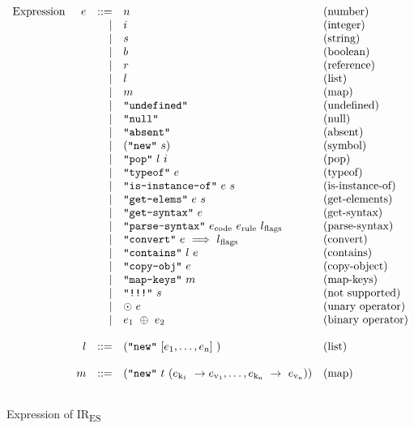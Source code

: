 \documentclass[acmsmall,screen]{acmart}
\newcommand{\irname}[0]{IR\textsubscript{ES}\xspace}
\newcommand{\Cd}[1]{\texttt{#1}}
\newcommand{\primitive}[1]{ \Cd{#1}}
\newcommand{\subsc}[2]{#1\textsubscript{#2}}
\begin{document}
\begin{figure}[t]
\[
\begin{array}{rrrll}
\text{Expression} & e & ::= & n & \text{(number)}\\
&&|& i & \text{(integer)}\\
&&|& s & \text{(string)}\\
&&|& b & \text{(boolean)}\\
&&|& r & \text{(reference)}\\
&&|& l & \text{(list)}\\
&&|& m & \text{(map)}\\
&&|& \primitive{"undefined"} & \text{(undefined)}\\
&&|& \primitive{"null"} & \text{(null)}\\
&&|& \primitive{"absent"} & \text{(absent)}\\
&&|& (\Cd{"new"}\ s) & \text{(symbol)}\\ %
&&|& \Cd{"pop"}\ l\ i & \text{(pop)}\\
&&|& \Cd{"typeof"}\ e& \text{(typeof)}\\
&&|& \Cd{"is-instance-of"}\ e\ s& \text{(is-instance-of)}\\
&&|& \Cd{"get-elems"}\ e\ s& \text{(get-elements)}\\
&&|& \Cd{"get-syntax"}\ e& \text{(get-syntax)}\\
&&|& \Cd{"parse-syntax"}\ \subsc{e}{code}\ \subsc{e}{rule}\ 
\subsc{l}{flags}& \text{(parse-syntax)}\\
&&|& \Cd{"convert"}\ e\ \Longrightarrow \ \subsc{l}{flags}& \text{(convert)}\\
&&|& \Cd{"contains"}\ l\ e& \text{(contains)}\\
&&|& \Cd{"copy-obj"}\ e& \text{(copy-object)}\\
&&|& \Cd{"map-keys"}\ m& \text{(map-keys)}\\
&&|& \Cd{"!!!"}\ s& \text{(not supported)}\\
&&|& \odot\ e& \text{(unary operator)}\\ %
&&|& \subsc{e}{1}\ \oplus\ \subsc{e}{2}& \text{(binary operator)}\\ %
\\

& l & ::= & (\Cd{"new"}\ [\subsc{e}{1},\dots,\subsc{e}{n}]\ )
& \text{(list)}\\
\\

& m & ::= & (\Cd{"new"}\ t\
(\subsc{e}{\subsc{k}{1}}\ \to \subsc{e}{\subsc{v}{1}}, \dots
, \subsc{e}{\subsc{k}{n}}\ \to\ \subsc{e}{\subsc{v}{n}}))
& \text{(map)}\\
\\
\end{array}
\]
\caption{Expression of \irname}
\label{fig:expr}
\end{figure}
\end{document}
